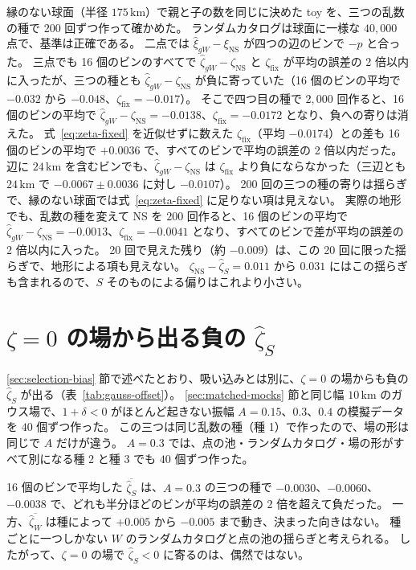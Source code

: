\documentclass[a4paper,11pt]{ltjsarticle}
\begin{document}
縁のない球面（半径 $175\,\mathrm{km}$）で親と子の数を同じに決めた toy を、三つの乱数の種で 200 回ずつ作って確かめた。
ランダムカタログは球面に一様な $40{,}000$ 点で、基準は正確である。
二点では $\hat\xi_{gW} - \xi_{\mathrm{NS}}$ が四つの辺のビンで $-p$ と合った。
三点でも 16 個のビンのすべてで $\hat\zeta_{gW} - \zeta_{\mathrm{NS}}$ と $\zeta_{\mathrm{fix}}$ が平均の誤差の 2 倍以内に入ったが、三つの種とも $\hat\zeta_{gW} - \zeta_{\mathrm{NS}}$ が負に寄っていた（16 個のビンの平均で $-0.032$ から $-0.048$、$\zeta_{\mathrm{fix}} = -0.017$）。
そこで四つ目の種で $2{,}000$ 回作ると、16 個のビンの平均で $\hat\zeta_{gW} - \zeta_{\mathrm{NS}} = -0.0138$、$\zeta_{\mathrm{fix}} = -0.0172$ となり、負への寄りは消えた。
式~\eqref{eq:zeta-fixed} を近似せずに数えた $\zeta_{\mathrm{fix}}$（平均 $-0.0174$）との差も 16 個のビンの平均で $+0.0036$ で、すべてのビンで平均の誤差の 2 倍以内だった。
辺に $24\,\mathrm{km}$ を含むビンでも、$\hat\zeta_{gW} - \zeta_{\mathrm{NS}}$ は $\zeta_{\mathrm{fix}}$ より負にならなかった（三辺とも $24\,\mathrm{km}$ で $-0.0067 \pm 0.0036$ に対し $-0.0107$）。
200 回の三つの種の寄りは揺らぎで、縁のない球面では式~\eqref{eq:zeta-fixed} に足りない項は見えない。
実際の地形でも、乱数の種を変えて NS を $200$ 回作ると、16 個のビンの平均で $\hat\zeta_{gW} - \zeta_{\mathrm{NS}} = -0.0013$、$\zeta_{\mathrm{fix}} = -0.0041$ となり、すべてのビンで差が平均の誤差の 2 倍以内に入った。
20 回で見えた残り（約 $-0.009$）は、この 20 回に限った揺らぎで、地形による項も見えない。
$\zeta_{\mathrm{NS}} - \hat\zeta_S = 0.011$ から $0.031$ にはこの揺らぎも含まれるので、$S$ そのものによる偏りはこれより小さい。

\section{$\zeta = 0$ の場から出る負の $\hat\zeta_S$}
\label{app:gauss-offset}

\ref{sec:selection-bias} 節で述べたとおり、吸い込みとは別に、$\zeta = 0$ の場からも負の $\hat\zeta_S$ が出る（表~\ref{tab:gauss-offset}）。
\ref{sec:matched-mocks} 節と同じ幅 $10\,\mathrm{km}$ のガウス場で、$1 + \delta < 0$ がほとんど起きない振幅 $A = 0.15$、$0.3$、$0.4$ の模擬データを $40$ 個ずつ作った。
この三つは同じ乱数の種（種 1）で作ったので、場の形は同じで $A$ だけが違う。
$A = 0.3$ では、点の池・ランダムカタログ・場の形がすべて別になる種 2 と種 3 でも $40$ 個ずつ作った。

16 個のビンで平均した $\overline{\hat\zeta_S}$ は、$A = 0.3$ の三つの種で $-0.0030$、$-0.0060$、$-0.0038$ で、どれも半分ほどのビンが平均の誤差の 2 倍を超えて負だった。
一方、$\overline{\hat\zeta_W}$ は種によって $+0.005$ から $-0.005$ まで動き、決まった向きはない。
種ごとに一つしかない $W$ のランダムカタログと点の池の揺らぎと考えられる。
したがって、$\zeta = 0$ の場で $\hat\zeta_S < 0$ に寄るのは、偶然ではない。
\end{document}
